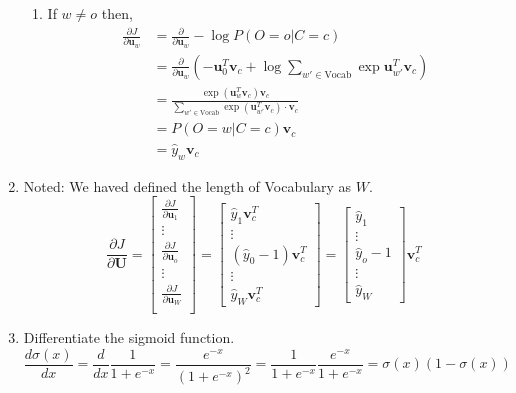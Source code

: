 \documentclass{amsart}
\theoremstyle{plain}
\theoremstyle{remark}
\numberwithin{equation}{section}
\begin{document}
\begin{enumerate}
\begin{enumerate}
\item If $w\ne o$ then,
\[
\begin{split}
\frac {\partial J} {\partial \mathbf u_w} &= \frac \partial {\partial \mathbf u_w} -\log P(O=o|C=c) \\
&= \frac \partial {\partial \mathbf u_w} \left ( - \mathbf u_0^T \mathbf v_c +\log \sum_{w'\in \text{Vocab}} \exp {\mathbf u}_{w'}^T \mathbf v_c \right ) \\
&= \frac { \exp \left ( \mathbf u_w^T \mathbf v_c \right ) \mathbf v_c} { \sum_{w' \in \text{Vocab}} \exp \left (\mathbf u_{w'}^T \mathbf v_c \right ) \cdot \mathbf v_c }  \\
&= P(O=w|C=c)\mathbf v_c \\
& = \hat y_w \mathbf v_c
\end{split}
\]
\end{enumerate}


\item Noted: We haved defined the length of Vocabulary as $W$.
\[
\frac {\partial J} {\partial \mathbf U} = 
\begin{bmatrix} 
\frac {\partial J} {\partial \mathbf u_1} \\
\vdots \\
\frac {\partial J} {\partial \mathbf u_o} \\
\vdots \\
\frac {\partial J} {\partial \mathbf u_W} \\
\end{bmatrix} =
\begin{bmatrix} 
\hat y_1 \mathbf v_c^T  \\
\vdots  \\
(\hat y_0 -1) \mathbf v_c^T \\
\vdots \\
\hat y_W \mathbf v_c^T 
\end{bmatrix} =
\begin{bmatrix}
\hat y_1 \\
\vdots \\
\hat y_o -1 \\
\vdots \\
\hat y_W 
\end{bmatrix} \mathbf v_c^T
\]

\item Differentiate the sigmoid function. 
\[
\frac {d\sigma (x)} {dx} = \frac d {dx} \frac 1 {1 + e^{-x}} = \frac {e^{-x}} {(1+e^{-x})^2} = \frac 1 {1+e^{-x}} \frac {e^{-x}} {1+e^{-x}} = \sigma(x)(1-\sigma(x))
\]



\end{enumerate}
\end{document}
